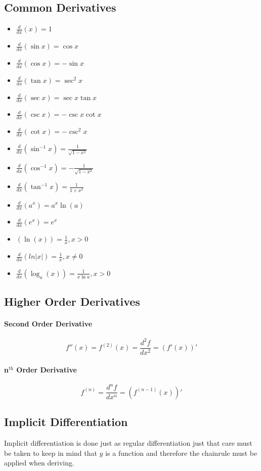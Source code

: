 \documentclass[a4paper, 10pt]{article}
\begin{document}
\subsection{Common Derivatives}
\begin{multicols}{2}
    \begin{itemize}
        \item[] \( \frac{d}{dx}(x) = 1 \)
        \item[] \( \frac{d}{dx}(\sin{x}) = \cos{x} \)
        \item[] \( \frac{d}{dx}(\cos{x}) = -\sin{x} \)
        \item[] \( \frac{d}{dx}(\tan{x}) = \sec^2x \)
        \item[] \( \frac{d}{dx}(\sec x) = \sec x\tan x \)
        \item[] \( \frac{d}{dx}(\csc x) = -\csc x\cot x \)
        \item[] \( \frac{d}{dx}(\cot x) = -\csc^2 x \)
        \item[] \( \frac{d}{dx}\left(\sin^{-1}x\right) = \frac{1}{\sqrt{1-x^2}} \)
        \item[] \( \frac{d}{dx}\left(\cos^{-1}x\right) = -\frac{1}{\sqrt{1-x^2}} \)
        \item[] \( \frac{d}{dx}\left(\tan^{-1}x\right) = \frac{1}{1+x^2} \)
        \item[] \( \frac{d}{dx}\left(a^x\right) = a^x\ln(a) \)
        \item[]  \( \frac{d}{dx}\left(e^x\right) = e^x \)
        \item[] \( \left(\ln(x)\right) = \frac{1}{x}, x > 0 \)
        \item[] \( \frac{d}{dx}(ln\lvert x\rvert) = \frac{1}{x}, x\neq0 \)
        \item[] \( \frac{d}{dx}\left(\log_a(x)\right) = \frac{1}{x\ln a}, x > 0 \)
    \end{itemize}
\end{multicols}
\subsection{Higher Order Derivatives}
\paragraph{Second Order Derivative}
\[ f''(x) = f^{(2)}(x) = \frac{d^2f}{dx^2} = \left(f'(x)\right)' \]
\paragraph{n\(^{\mathrm{th}}\) Order Derivative}
\[ f^{(n)} = \frac{d^nf}{dx^n} = \left(f^{(n-1)}(x)\right)' \]
\subsection{Implicit Differentiation}
Implicit differentiation is done just as regular differentiation just that care must be taken to keep in mind that \(y\) is a function and therefore the chainrule must be applied when deriving.
\end{document}
